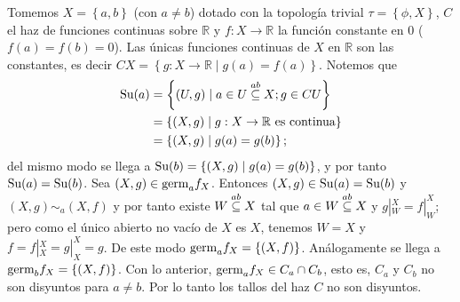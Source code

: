 \begin{Ejm}
   Tomemos $X=\left\lbrace a,b\right\rbrace$ (con $a\neq b$) dotado con la topología trivial $\tau=\left\lbrace \phi,X\right\rbrace$, $C$ el haz de funciones continuas sobre $\mathbb{R}$ y $f:X\to \mathbb{R}$ la función constante en $0$ ($f(a)=f(b)=0$). Las únicas funciones continuas de $X$ en $\mathbb{R}$ son las constantes, es decir $CX=\left\lbrace g:X\to\mathbb{R}\mid g(a)=f(a)\right\rbrace$. Notemos que
   $$
   \begin{aligned}
      \normalfont{\text{Su}}(a)&=\left\lbrace (U,g)\mid a\in U\stackrel{ab}{\subseteq} X;g\in CU\right\rbrace\\
            &=\left\lbrace (X,g)\mid g:X\to\mathbb{R} \text{ es continua}\right\rbrace\\
            &=\left\lbrace (X,g)\mid g(a)=g(b)\right\rbrace;\\
   \end{aligned}
   $$
   del mismo modo se llega a $\normalfont{\text{Su}}(b)=\left\lbrace (X,g)\mid g(a)=g(b)\right\rbrace$, y por tanto $\normalfont{\text{Su}}(a)=\normalfont{\text{Su}}(b)$. Sea $(X,g)\in\normalfont{\text{germ}}_{a}f_{X}$. Entonces $(X,g)\in\normalfont{\text{Su}}(a)=\normalfont{\text{Su}}(b)$ y $(X,g)\sim_{a}(X,f)$ y por tanto existe $W\stackrel{ab}{\subseteq} X$ tal que $a\in W\stackrel{ab}{\subseteq} X$ y $g|^{X}_{W}=f|^{X}_{W}$; pero como el único abierto no vacío de $X$ es $X$, tenemos $W=X$ y $f=f|^{X}_{X}=g|^{X}_{X}=g$. De este modo $\normalfont{\text{germ}}_{a}f_{X}=\left\lbrace (X,f)\right\rbrace$. Análogamente se llega a $\normalfont{\text{germ}}_{b}f_{X}=\left\lbrace (X,f)\right\rbrace$. Con lo anterior, $\normalfont{\text{germ}}_{a}f_{X}\in C_{a}\cap C_{b}$, esto es, $C_a$ y $C_b$ no son disyuntos para $a\neq b$. Por lo tanto los tallos del haz $C$ no son disyuntos.
\end{Ejm}


